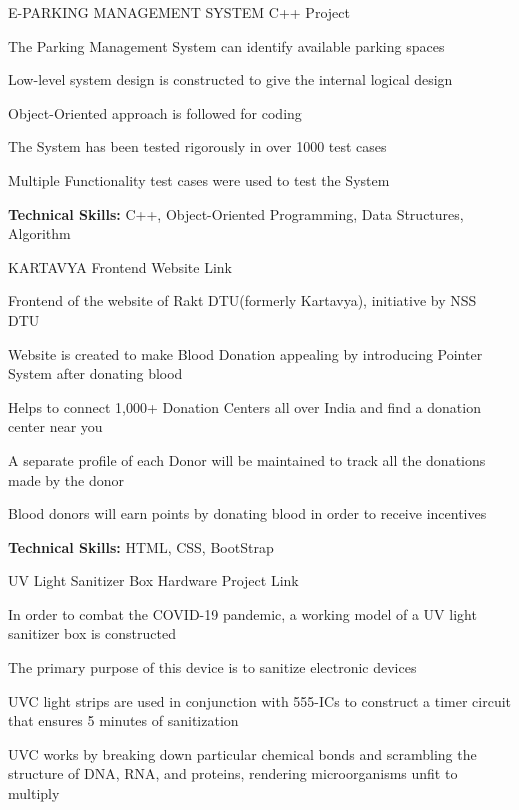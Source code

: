 \begin{cventries}
  \cventry
    {} %
    {E-PARKING MANAGEMENT SYSTEM} %
    {C++ Project} %
    {} %
    {
      \begin{cvitems} %
        \item {The Parking Management System can identify available parking spaces}
        \item {Low-level system design is constructed to give the internal logical design}
        \item {Object-Oriented approach is followed for coding}
        \item {The System has been tested rigorously in over 1000 test cases}
        \item {Multiple Functionality test cases were used to test the System}
        \item {\textbf{Technical Skills:} C++, Object-Oriented Programming, Data Structures, Algorithm}
      \end{cvitems}
    }
  \cventry
    {} %
    {KARTAVYA} %
    {Frontend Website} %
    {Link}%
    {
      \begin{cvitems} %
        \item{Frontend of the website of Rakt DTU(formerly Kartavya), initiative by NSS DTU}
        \item {Website is created to make Blood Donation appealing by introducing Pointer System after donating blood}
        \item {Helps to connect 1,000+ Donation Centers all over India and find a donation center near you}
        \item {A separate profile of each Donor will be maintained to track all the donations made by the donor}
        \item {Blood donors will earn points by donating blood in order to receive incentives}
        \item {\textbf{Technical Skills:} HTML, CSS, BootStrap}
      \end{cvitems}
    }
  \cventry
    {} %
    {UV Light Sanitizer Box} %
    {Hardware Project} %
    {Link} %
    {
      \begin{cvitems} %
        \item {In order to combat the COVID-19 pandemic, a working model of a UV light sanitizer box is constructed}
        \item {The primary purpose of this device is to sanitize electronic devices}
        \item {UVC light strips are used in conjunction with 555-ICs to construct a timer circuit that ensures 5 minutes of sanitization}
        \item {UVC works by breaking down particular chemical bonds and scrambling the structure of DNA, RNA, and proteins, rendering microorganisms unfit to multiply}
        \url{}
      \end{cvitems}
    }
\end{cventries}